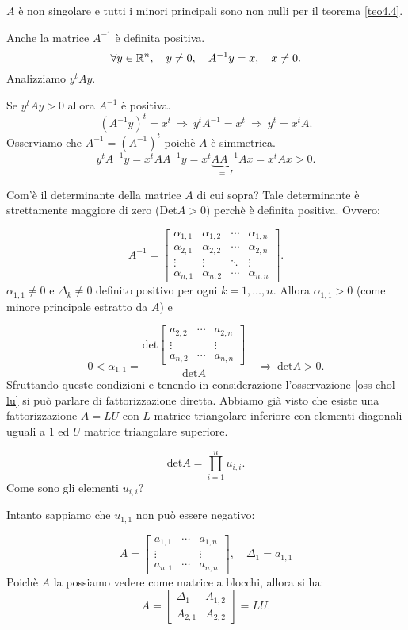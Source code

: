 \begin{osse}\label{oss-chol-lu}
$A$ è non singolare e tutti i minori principali sono non nulli per il
teorema \ref{teo4.4}.
\end{osse}

\begin{osse}Anche la matrice $A^{-1}$ è definita positiva.
\[\forall y \in \mathbb{R}^n, \quad y \neq 0, \quad A^{-1}y = x, \quad x \neq 0.\]
Analizziamo $y^tAy$.

Se $y^tAy > 0$ allora $A^{-1}$ è positiva.
\[(A^{-1}y)^t = x^t \ \Longrightarrow \ y^tA^{-1} = x^t\  \Longrightarrow \
y^t = x^tA.\]
Osserviamo che $A^{-1} =(A^{-1})^t$ poichè $A$ è simmetrica.
\[y^tA^{-1}y = x^tAA^{-1}y = x^t\underbrace{AA^{-1}}_{= \ I}Ax = x^tAx > 0.\]
\end{osse}

Com'è il determinante della matrice $A$ di cui sopra? Tale determinante è
strettamente maggiore di zero (Det$A > 0$) perchè è definita positiva.
Ovvero:

\[A^{-1} = \left[
\begin{array}{cccc}
\alpha_{1,1} & \alpha_{1,2} & \cdots & \alpha_{1,n} \\
\alpha_{2,1} & \alpha_{2,2} &\cdots & \alpha_{2,n} \\
\vdots & \vdots &\ddots & \vdots \\
\alpha_{n,1} & \alpha_{n,2} & \cdots & \alpha_{n,n}
\end{array}
\right].
\]
$\alpha_{1,1} \neq 0$ e $\Delta_k \neq 0$ definito positivo per ogni
$k = 1,\ldots, n$. Allora $\alpha_{1,1} > 0$ (come minore principale estratto
da $A$) e

\[0 < \alpha_{1,1} = \frac{\textrm{det}\left[
\begin{array}{ccc}
a_{2,2} & \cdots & a_{2,n} \\
\vdots &        & \vdots \\
a_{n,2} & \cdots & a_{n,n}
\end{array}\right]}{\textrm{det}A}  \quad \Rightarrow \ \textrm{det}A > 0.
\]
Sfruttando queste condizioni e tenendo in considerazione l'osservazione \ref{oss-chol-lu}
si può parlare di fattorizzazione diretta. Abbiamo già visto che esiste una
fattorizzazione $A = LU$ con $L$ matrice triangolare inferiore con elementi
diagonali uguali a $1$ ed $U$ matrice triangolare superiore.

\[\textrm{det}A = \prod_{i = 1}^{n}u_{i,i}.\]
Come sono gli elementi $u_{i,i}$?
\begin{flushleft}
Intanto sappiamo che $u_{1,1}$ non può essere negativo:
\end{flushleft}
\[A =
\left[
\begin{array}{ccc}
a_{1,1} & \cdots & a_{1,n} \\
\vdots &        & \vdots \\
a_{n,1} & \cdots & a_{n,n}
\end{array}\right], \quad \Delta_1 = a_{1,1}
\]
Poichè $A$ la possiamo vedere come matrice a blocchi, allora si ha:
\[A = \left[
\begin{array}{c|c}
\Delta_1 & A_{1,2} \\
\hline
A_{2,1} & A_{2,2}
\end{array}\right] = LU.
\]

